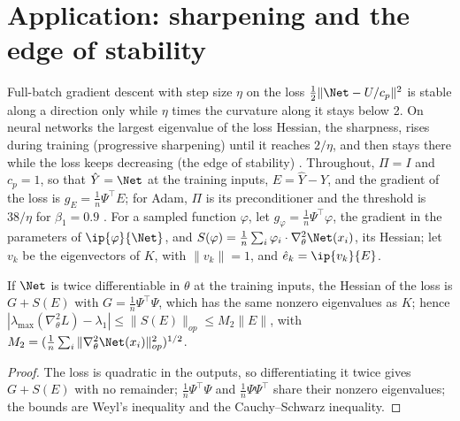 \section{Application: sharpening and the edge of stability}\label{sec:eos}

Full-batch gradient descent with step size $\eta$ on the loss $\frac12\|\Net - U/c_p\|^2$ is stable along a direction only while $\eta$ times the curvature along it stays below 2.
On neural networks the largest eigenvalue of the loss Hessian, the sharpness, rises during training (progressive sharpening) until it reaches $2/\eta$, and then stays there while the loss keeps decreasing (the edge of stability) \cite{cohen2021}.
Throughout, $\Pi = I$ and $c_p = 1$, so that $\hat Y = \Net$ at the training inputs, $E = \hat Y - Y$, and the gradient of the loss is $g_E = \frac1n\Psi^\top E$; for Adam, $\Pi$ is its preconditioner and the threshold is $38/\eta$ for $\beta_1 = 0.9$ \cite{cohen2022adaptive}.
For a sampled function $\varphi$, let $g_\varphi = \frac1n\Psi^\top\varphi$, the gradient in the parameters of $\ip{\varphi}{\Net}$, and $S(\varphi) = \frac1n\sum_i\varphi_i\cdot\nabla^2_\theta\Net(x_i)$, its Hessian; let $v_k$ be the eigenvectors of $K$, with $\|v_k\| = 1$, and $\hat e_k = \ip{v_k}{E}$.

\begin{proposition}\label{eos:prop:hess}
If $\Net$ is twice differentiable in $\theta$ at the training inputs, the Hessian of the loss is $G + S(E)$ with $G = \frac1n\Psi^\top\Psi$, which has the same nonzero eigenvalues as $K$; hence $|\lambda_{\max}(\nabla^2_\theta L) - \lambda_1| \le \|S(E)\|_{op} \le M_2\|E\|$, with $M_2 = (\frac1n\sum_i\|\nabla^2_\theta\Net(x_i)\|_{op}^2)^{1/2}$.
\end{proposition}

\begin{proof}
The loss is quadratic in the outputs, so differentiating it twice gives $G + S(E)$ with no remainder; $\frac1n\Psi^\top\Psi$ and $\frac1n\Psi\Psi^\top$ share their nonzero eigenvalues; the bounds are Weyl's inequality and the Cauchy--Schwarz inequality.
\end{proof}

